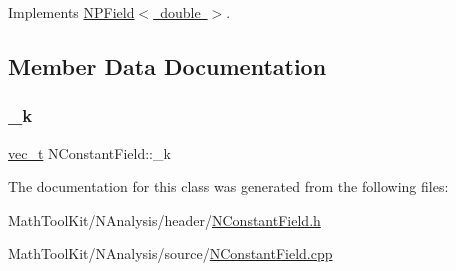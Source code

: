 Implements \mbox{\hyperlink{class_n_p_field_a6b92c4782bf41c0b81751821b93eb445}{N\+P\+Field$<$ double $>$}}.



\subsection{Member Data Documentation}
\mbox{\label{class_n_constant_field_adc7caf84cc8e117807c19c95cb47d1bc}} 
\subsubsection{\texorpdfstring{\_k}{\_k}}
{\footnotesize\ttfamily \mbox{\hyperlink{group___n_algebra_ga0a2cfc67e738a3d73e4f12098c4c07f6}{vec\+\_\+t}} N\+Constant\+Field\+::\+\_\+k\hspace{0.3cm}{\ttfamily [protected]}}



The documentation for this class was generated from the following files\+:\begin{DoxyCompactItemize}
\item 
Math\+Tool\+Kit/\+N\+Analysis/header/\mbox{\hyperlink{_n_constant_field_8h}{N\+Constant\+Field.\+h}}\item 
Math\+Tool\+Kit/\+N\+Analysis/source/\mbox{\hyperlink{_n_constant_field_8cpp}{N\+Constant\+Field.\+cpp}}\end{DoxyCompactItemize}

